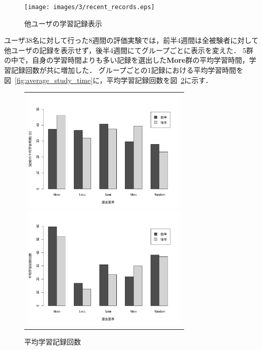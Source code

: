 \begin{figure}[htb]
	\begin{center}
	\texttt{[image: images/3/recent\_records.eps]}
	\end{center}
	\caption{他ユーザの学習記録表示}
	\label{fig:recent_records}
\end{figure}

ユーザ38名に対して行った8週間の評価実験では，前半4週間は全被験者に対して他ユーザの記録を表示せず，後半4週間にてグループごとに表示を変えた．
5群の中で，自身の学習時間よりも多い記録を選出した{\bf More}群の平均学習時間，学習記録回数が共に増加した．
グループごとの1記録における平均学習時間を図~\ref{fig:average_study_time}に，平均学習記録回数を図~\ref{fig:average_of_study_session}に示す．

\begin{figure}[ht]
\begin{center}
\begin{tabular}{c}

	\begin{minipage}[b]{0.5\linewidth}
	\begin{center}
		\includegraphics[width=8cm]{images/3/average_of_studying_time.pdf}
		\caption{1記録の平均学習時間}
		\label{fig:average_study_time}
	\end{center}
	\end{minipage}

	\begin{minipage}[b]{0.5\linewidth}
	\begin{center}
		\includegraphics[width=8cm]{images/3/average_of_study_session.pdf}
		\caption{平均学習記録回数}
		\label{fig:average_of_study_session}
	\end{center}
	\end{minipage}

\end{tabular}
\end{center}
\end{figure}

